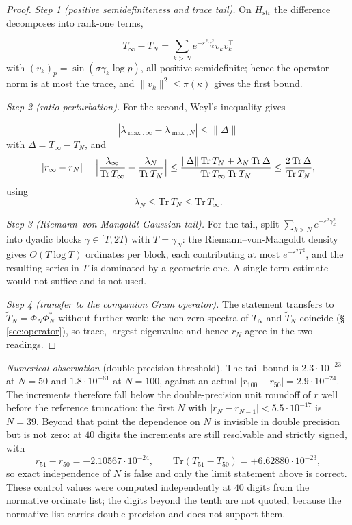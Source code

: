 \documentclass[11pt]{article}
\newcommand{\Hstr}{H_{\mathrm{str}}}
\newcommand{\Tt}{\widetilde{T}}
\begin{document}
\begin{proof}
\textit{Step 1 (positive semidefiniteness and trace tail).}
On $\Hstr$ the difference decomposes into rank-one terms,

\[
T_\infty-T_N=\sum_{k>N}e^{-\varepsilon^2\gamma_k^2}v_kv_k^{\!\top}
\]
 with
$(v_k)_p=\sin(\sigma\gamma_k\log p)$, all positive semidefinite; hence the
operator norm is at most the trace, and $\|v_k\|^2\le\pi(\kappa)$ gives the
first bound.

\textit{Step 2 (ratio perturbation).} For the second, Weyl's inequality gives

\[
|\lambda_{\max,\infty}-\lambda_{\max,N}|\le\|\Delta\|
\]
 with
$\Delta=T_\infty-T_N$, and
\[
|r_\infty-r_N|
=\Bigl|\frac{\lambda_{\infty}}{\mathrm{Tr}\,T_\infty}
      -\frac{\lambda_{N}}{\mathrm{Tr}\,T_N}\Bigr|
\le\frac{\|\Delta\|\,\mathrm{Tr}\,T_N+\lambda_N\,\mathrm{Tr}\,\Delta}
        {\mathrm{Tr}\,T_\infty\,\mathrm{Tr}\,T_N}
\le\frac{2\,\mathrm{Tr}\,\Delta}{\mathrm{Tr}\,T_N},
\]
using 
\[
\lambda_N\le\mathrm{Tr}\,T_N\le\mathrm{Tr}\,T_\infty.
\]


\textit{Step 3 (Riemann--von-Mangoldt Gaussian tail).} For the tail, split $\sum_{k>N}e^{-\varepsilon^2\gamma_k^2}$ into dyadic blocks
$\gamma\in[T,2T)$ with $T=\gamma_N$: the Riemann--von-Mangoldt density gives
$O(T\log T)$ ordinates per block, each contributing at most
$e^{-\varepsilon^2T^2}$, and the resulting series in $T$ is dominated by a
geometric one. A single-term estimate would not suffice and is not used.

\textit{Step 4 (transfer to the companion Gram operator).}
The statement transfers to $\Tt_N=\Phi_N\Phi_N^{*}$ without further work:
the non-zero spectra of $T_N$ and $\Tt_N$ coincide (\S\,\ref{sec:operator}),
so trace, largest eigenvalue and hence $r_N$ agree in the two readings.
\end{proof}

\emph{Numerical observation} (double-precision threshold). The tail bound is
$2.3\cdot10^{-23}$ at $N=50$ and $1.8\cdot10^{-61}$ at $N=100$, against an
actual $|r_{100}-r_{50}|=2.9\cdot10^{-24}$. The increments therefore fall
below the double-precision unit roundoff of $r$ well before the reference
truncation: the first $N$ with $|r_N-r_{N-1}|<5.5\cdot10^{-17}$ is $N=39$.
Beyond that point the dependence on $N$ is invisible in double precision but
is not zero: at $40$ digits the increments are still resolvable and strictly
signed, with
\[
r_{51}-r_{50}=-2.10567\cdot10^{-24},
\qquad
\mathrm{Tr}(T_{51}-T_{50})=+6.62880\cdot10^{-23},
\]
so exact independence of $N$ is false and only the limit statement above is
correct. These control values were computed independently at $40$ digits from
the normative ordinate list; the digits beyond the tenth are not quoted,
because the normative list carries double precision and does not support
them.
\end{document}
